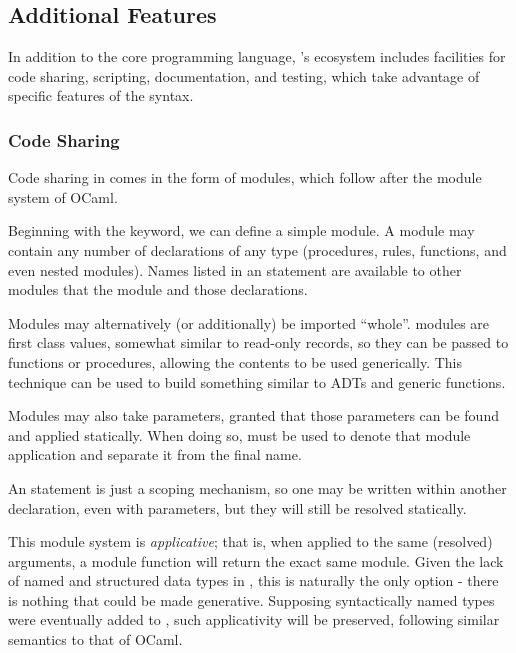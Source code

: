 \subsection{Additional Features}

In addition to the core programming language, \Trilogy{}'s ecosystem includes
facilities for code sharing, scripting, documentation, and testing, which
take advantage of specific features of the syntax.

\subsubsection{Code Sharing}

Code sharing in \Trilogy{} comes in the form of modules, which follow after
the module system of OCaml.


Beginning with the  keyword, we can define a simple module. A
module may contain any number of declarations of any type (procedures,
rules, functions, and even nested modules). Names listed in an 
statement are available to other modules that  the module and
 those declarations.


Modules may alternatively (or additionally) be imported ``whole''. \Trilogy{}
modules are first class values, somewhat similar to read-only records, so they
can be passed to functions or procedures, allowing the contents to be used
generically. This technique can be used to build something similar to ADTs
and generic functions.


Modules may also take parameters, granted that those parameters can be found
and applied statically. When doing so,  must be used to denote that
module application and separate it from the final name.

An  statement is just a scoping mechanism, so one may be written
within another declaration, even with parameters, but they will still be
resolved statically.

This module system is \emph{applicative}; that is, when applied to the same
(resolved) arguments, a module function will return the exact same module.
Given the lack of named and structured data types in \Trilogy{}, this is
naturally the only option - there is nothing that could be made generative.
Supposing syntactically named types were eventually added to \Trilogy{},
such applicativity will be preserved, following similar semantics to that of
OCaml.


